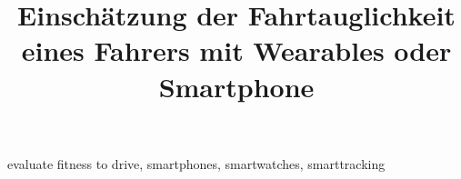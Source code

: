 \documentclass[conference]{IEEEtran}
\begin{document}
\title{Einschätzung der Fahrtauglichkeit eines Fahrers mit Wearables oder Smartphone}

\author{
}

\maketitle

\begin{abstract}

\end{abstract}

\begin{IEEEkeywords}
evaluate fitness to drive, smartphones, smartwatches, smarttracking
\end{IEEEkeywords}










\end{document}
